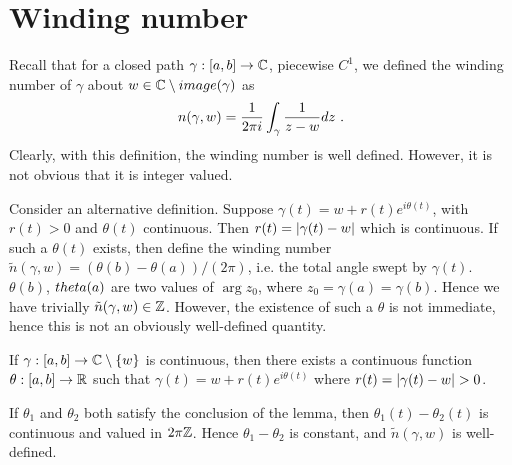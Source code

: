 \section{Winding number}

Recall that for a closed path $\gamma : [a, b] \rightarrow \mathbb{C}$, piecewise $C^1$, we defined the winding number of $\gamma$ about $w \in \mathbb{C} \setminus \mathop{image}(\gamma)$ as
\[
n(\gamma, w) = \frac{1}{2 \pi i}\int_\gamma \frac{1}{z - w} dz \ \text{.}
\]
Clearly, with this definition, the winding number is well defined.
However, it is not obvious that it is integer valued.

Consider an alternative definition. Suppose $\gamma(t) = w + r(t)e^{i \theta(t)}$, with $r(t) > 0$ and $\theta(t)$ continuous.
Then $r(t) = \lvert \gamma(t) - w \rvert$ which is continuous.
If such a $\theta(t)$ exists, then define the winding number $\tilde{n}(\gamma, w) = (\theta(b) - \theta(a))/(2 \pi)$, i.e. the total angle swept by $\gamma(t)$.
$\theta(b)$, $\\theta(a)$ are two values of $\arg z_0$, where $z_0 = \gamma(a) = \gamma(b)$.
Hence we have trivially $\tilde{n}(\gamma, w) \in \mathbb{Z}$.
However, the existence of such a $\theta$ is not immediate, hence this is not an obviously well-defined quantity.

\begin{lemma}
  If $\gamma : [a, b] \rightarrow \mathbb{C} \setminus \{ w \}$ is continuous, then there exists a continuous function $\theta : [a, b] \rightarrow \mathbb{R}$ such that $\gamma(t) = w + r(t)e^{i \theta(t)}$ where $r(t) = \lvert\gamma(t) - w\rvert > 0$.
\end{lemma}

\begin{remark}
  If $\theta_1$ and $\theta_2$ both satisfy the conclusion of the lemma, then $\theta_1(t) - \theta_2(t)$ is continuous and valued in $2 \pi \mathbb{Z}$.
Hence $\theta_1 - \theta_2$ is constant, and $\tilde{n}(\gamma, w)$ is well-defined.
\end{remark}

